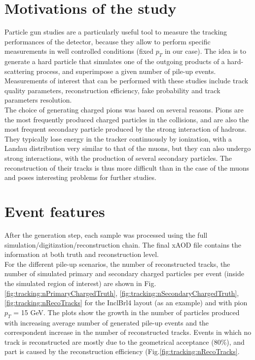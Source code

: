 \documentclass[a4paper,twoside,12pt]{book}
\begin{document}
\section{Motivations of the study}
Particle gun studies are a particularly useful tool to measure the tracking performances of the detector, because they allow to perform
specific measurements in well controlled conditions (fixed $p_{T}$ in our case). The idea is to generate a hard particle that
simulates one of the outgoing products of a hard-scattering process, and superimpose a given number of pile-up events. Measurements of interest that can be performed 
with these studies include track quality parameters, reconstruction efficiency, fake probability and track parameters resolution.\\

The choice of generating charged pions was based on several reasons. Pions are the most frequently
produced charged particles in the collisions, and are also the most frequent secondary particle produced by the strong interaction of hadrons. They typically lose energy in the tracker continuously by ionization, with a Landau distribution very similar to that of the muons, but they can also undergo strong interactions, with the production of several secondary particles. The reconstruction of their tracks
is thus more difficult than in the case of the muons and poses interesting problems for further studies.

\section{Event features}\label{subsec:tracking:eventFeatures}
After the generation step, each sample was processed using the full simulation/digitization/reconstruction chain. The final xAOD file contains the information at both
truth and reconstruction level. \\

For the different pile-up scenarios, the number of reconstructed tracks, the number of simulated primary and secondary charged particles per event
(inside the simulated region of interest) are shown in Fig.\ref{fig:tracking:nPrimaryChargedTruth}, \ref{fig:tracking:nSecondaryChargedTruth}, \ref{fig:tracking:nRecoTracks} for the InclBrl4 layout (as an example) and with pion $p_{T}$ = 15 GeV. The plots show the growth in the number of particles produced with increasing average number of generated pile-up events and
the correspondent increase in the number of reconstructed tracks. Events in which no track is reconstructed are mostly due to the geometrical acceptance (80\%), and part is caused by the reconstruction efficiency (Fig.\ref{fig:tracking:nRecoTracks}. \\
\end{document}
